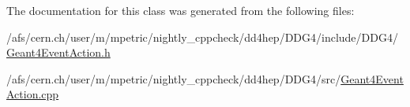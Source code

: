 The documentation for this class was generated from the following files\+:\begin{DoxyCompactItemize}
\item 
/afs/cern.\+ch/user/m/mpetric/nightly\+\_\+cppcheck/dd4hep/\+D\+D\+G4/include/\+D\+D\+G4/\hyperlink{_geant4_event_action_8h}{Geant4\+Event\+Action.\+h}\item 
/afs/cern.\+ch/user/m/mpetric/nightly\+\_\+cppcheck/dd4hep/\+D\+D\+G4/src/\hyperlink{_geant4_event_action_8cpp}{Geant4\+Event\+Action.\+cpp}\end{DoxyCompactItemize}
